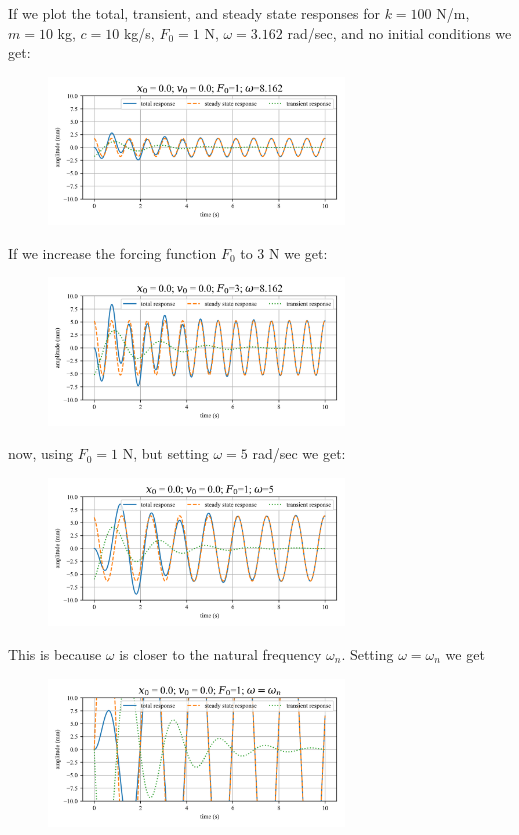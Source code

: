 \documentclass[12pt,letter]{article}
\numberwithin{ex}{section} %
\begin{document}
			If we plot the total, transient, and steady state responses for $k=100$ N/m, $m=10$ kg,  $c=10$ kg/s, $F_0=1$ N, $\omega=3.162$ rad/sec, and no initial conditions we get:
			\begin{figure}[H]
				\centering
				\includegraphics[width=0.7\textwidth]{../Figures/example_1_1.png}
			\end{figure}			
			If we increase the forcing function $F_0$ to 3 N we get:
			\begin{figure}[H]
				\centering
				\includegraphics[width=0.7\textwidth]{../Figures/example_1_2.png}
			\end{figure}			
			now, using $F_0=1$ N, but setting $\omega=5$ rad/sec we get:
			\begin{figure}[H]
				\centering
				\includegraphics[width=0.7\textwidth]{../Figures/example_1_3.png}
			\end{figure}				
			This is because $\omega$ is closer to the natural frequency $\omega_n$. Setting $\omega=\omega_n$ we get
			\begin{figure}[H]
				\centering
				\includegraphics[width=0.7\textwidth]{../Figures/example_1_4.png}
			\end{figure}			
\end{document}
